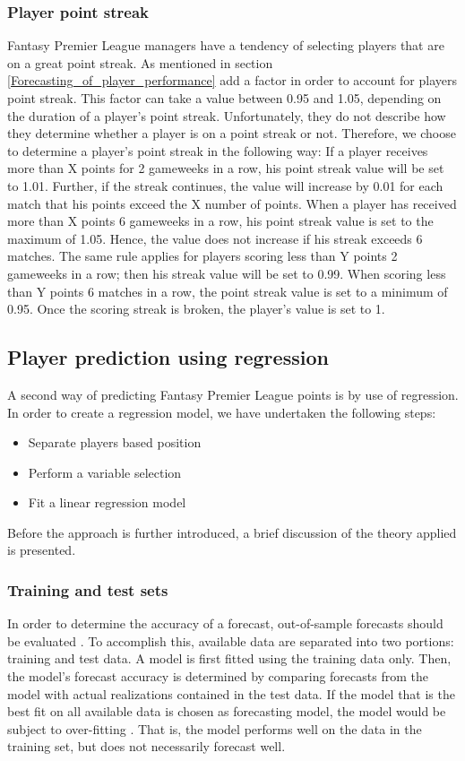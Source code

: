 \subsubsection{Player point streak}
Fantasy Premier League managers have a tendency of selecting players that are on a great point streak. As mentioned in section \ref{Forecasting_of_player_performance} \cite{Bonomo} add a factor in order to account for players point streak. This factor can take a value between 0.95 and 1.05, depending on the duration of a player's point streak. Unfortunately, they do not describe how they determine whether a player is on a point streak or not. Therefore, we choose to determine a player's point streak in the following way: 
\newpar
If a player receives more than X points for 2 gameweeks in a row, his point streak value will be set to 1.01. Further, if the streak continues, the value will increase by 0.01 for each match that his points exceed the X number of points. When a player has received more than X points 6 gameweeks in a row, his point streak value is set to the maximum of 1.05. Hence, the value does not increase if his streak exceeds 6 matches. The same rule applies for players scoring less than Y points 2 gameweeks in a row; then his streak value will be set to 0.99. When scoring less than Y points 6 matches in a row, the point streak value is set to a minimum of 0.95. Once the scoring streak is broken, the player's value is set to 1. 


\subsection{Player prediction using regression}
\label{Sol_approach_regression}

A second way of predicting Fantasy Premier League points is by use of regression. In order to create a regression model, we have undertaken the following steps:
\begin{itemize}
    \item Separate players based position
    \item Perform a variable selection
    \item Fit a linear regression model
\end{itemize}
Before the approach is further introduced, a brief discussion of the theory applied is presented.


\subsubsection{Training and test sets}
In order to determine the accuracy of a forecast, out-of-sample forecasts should be evaluated \citep{Hyndman}. To accomplish this, available data are separated into two portions: training and test data. A model is first fitted using the training data only. Then, the model's forecast accuracy is determined by comparing forecasts from the model with actual realizations contained in the test data. 
If the model that is the best fit on all available data is chosen as forecasting model, the model would be subject to over-fitting \citep{Hyndman}. That is, the model performs well on the data in the training set, but does not necessarily forecast well.

